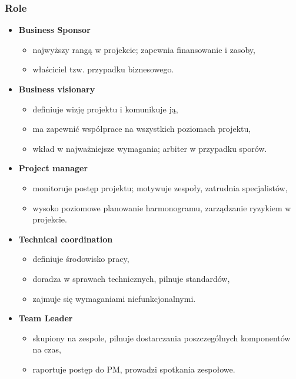 \documentclass[a4paper]{article}
\begin{document}
    \subsubsection{Role}
    \begin{itemize}
        \item \textbf{Business Sponsor}
        \begin{itemize}
            \item najwyższy rangą w projekcie; zapewnia finansowanie i zasoby,
            \item właściciel tzw. przypadku biznesowego.
        \end{itemize}
        \item \textbf{Business visionary}
        \begin{itemize}
            \item definiuje wizję projektu i komunikuje ją,
            \item ma zapewnić współprace na wszystkich poziomach projektu,
            \item wkład w najważniejsze wymagania; arbiter w przypadku sporów.
        \end{itemize}
        \item \textbf{Project manager}
        \begin{itemize}
            \item monitoruje postęp projektu; motywuje zespoły, zatrudnia specjalistów,
            \item wysoko poziomowe planowanie harmonogramu, zarządzanie ryzykiem w projekcie.
        \end{itemize}
        \item \textbf{Technical coordination}
        \begin{itemize}
            \item definiuje środowisko pracy,
            \item doradza w sprawach technicznych, pilnuje standardów,
            \item zajmuje się wymaganiami niefunkcjonalnymi.
        \end{itemize}
        \item \textbf{Team Leader}
        \begin{itemize}
            \item skupiony na zespole, pilnuje dostarczania poszczególnych komponentów na czas,
            \item raportuje postęp do PM, prowadzi spotkania zespołowe.
        \end{itemize}

\end{itemize}
\end{document}

